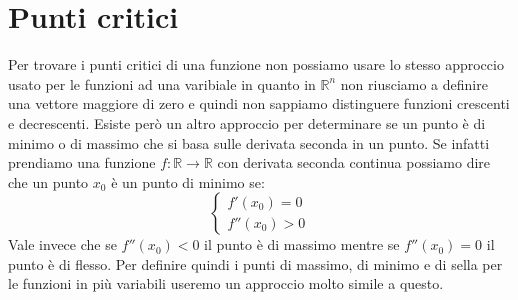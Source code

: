 \section{Punti critici}
Per trovare i punti critici di una funzione non possiamo usare lo stesso 
approccio usato per le funzioni ad una varibiale in quanto in $\mathbb{R}^n$ 
non riusciamo a definire una vettore maggiore di zero e quindi non sappiamo 
distinguere funzioni crescenti e decrescenti. Esiste però un altro approccio 
per determinare se un punto è di minimo o di massimo che si basa sulle derivata 
seconda in un punto. Se infatti prendiamo una funzione $f: \mathbb{R} \to 
\mathbb{R}$ con derivata seconda continua possiamo dire che un punto $x_0$ è 
un punto di minimo se: 
\begin{equation*}
	\begin{cases}
		f'(x_0) = 0\\
		f''(x_0) > 0
	\end{cases}
\end{equation*}
Vale invece che se $f''(x_0) < 0$ il punto è di massimo mentre se $f''(x_0) 
= 0$ il punto è di flesso. Per definire quindi i punti di massimo, di minimo e 
di sella per le funzioni in più variabili useremo un approccio molto simile a 
questo.

